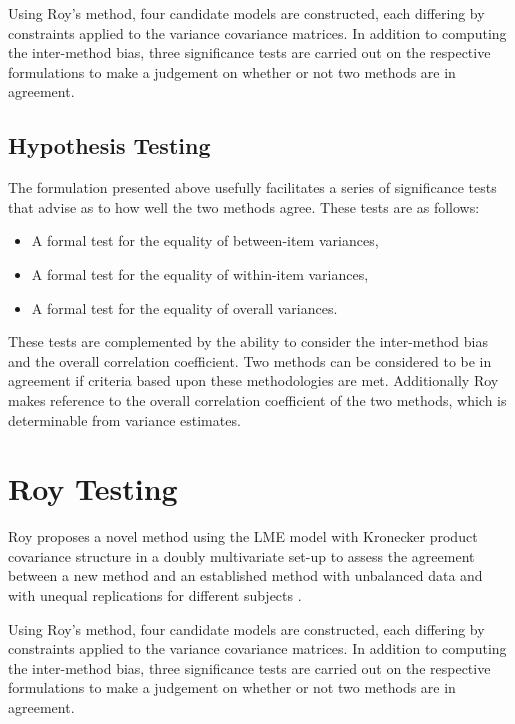 \documentclass[12pt, a4paper]{report}
\theoremstyle{plain}
\theoremstyle{definition}
\theoremstyle{remark}
\begin{document}
Using Roy's method, four candidate models are constructed, each differing by constraints applied to the variance covariance matrices. In addition to computing the inter-method bias, three significance tests are carried out on the respective formulations to make a judgement on whether or not two methods are in agreement.


\subsection{Hypothesis Testing}
The formulation presented above usefully facilitates a series of
significance tests that advise as to how well the two methods
agree. These tests are as follows:
\begin{itemize}
	\item A formal test for the equality of between-item variances,
	\item A formal test for the equality of within-item variances,
	\item A formal test for the equality of overall variances.
\end{itemize}
These tests are complemented by the ability to consider the inter-method bias and the overall correlation coefficient. Two methods can be considered to be in agreement if criteria based upon these methodologies are met. Additionally Roy makes reference to the overall correlation coefficient of the two methods, which is determinable from variance estimates.





\section{Roy Testing}

Roy proposes a novel method using the LME model with Kronecker product covariance structure in a doubly multivariate set-up to assess the agreement between a new method and an established method with unbalanced data and with unequal replications for different subjects \citep{Roy}.

Using Roy's method, four candidate models are constructed, each differing by constraints applied to the variance covariance matrices. In addition to computing the inter-method bias, three significance tests are carried out on the respective formulations to make a judgement on whether or not two methods are in agreement.
\end{document}
